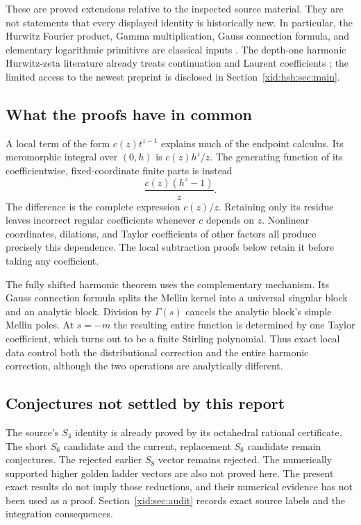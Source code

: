 \documentclass[11pt,a4paper]{article}
\numberwithin{equation}{section}
\theoremstyle{definition}
\theoremstyle{remark}
\begin{document}
These are proved extensions relative to the inspected source material.
They are not statements that every displayed identity is historically
new. In particular, the Hurwitz Fourier product, Gamma multiplication,
Gauss connection formula, and elementary logarithmic primitives are
classical inputs \cite{EspinosaMoll1,EspinosaMoll2,DLMFhurwitz,
hsh:DLMFGauss,wat:DavidH}. The depth-one harmonic Hurwitz-zeta literature
already treats continuation and Laurent coefficients
\cite{hsh:Kargin2023,hsh:KaraCan2026}; the limited access to the newest
preprint is disclosed in Section~\ref{xid:hsh:sec:main}.

\subsection{What the proofs have in common}

A local term of the form $c(z)t^{z-1}$ explains much of the endpoint
calculus. Its meromorphic integral over $(0,h)$ is $c(z)h^z/z$.
The generating function of its coefficientwise, fixed-coordinate finite
parts is instead
\[
 \frac{c(z)(h^z-1)}z.
\]
The difference is the complete expression $c(z)/z$. Retaining only its
residue leaves incorrect regular coefficients whenever $c$ depends on
$z$. Nonlinear coordinates, dilations, and Taylor coefficients of other
factors all produce precisely this dependence. The local subtraction
proofs below retain it before taking any coefficient.

The fully shifted harmonic theorem uses the complementary mechanism.
Its Gauss connection formula splits the Mellin kernel into a universal
singular block and an analytic block. Division by $\Gamma(s)$ cancels
the analytic block's simple Mellin poles. At $s=-m$ the resulting entire
function is determined by one Taylor coefficient, which turns out to be
a finite Stirling polynomial. Thus exact local data control both the
distributional correction and the entire harmonic correction, although
the two operations are analytically different.

\subsection{Conjectures not settled by this report}

The source's $S_4$ identity is already proved by its octahedral rational
certificate. The short $S_6$ candidate and the current, replacement $S_8$
candidate remain conjectures. The rejected earlier $S_8$ vector remains
rejected. The numerically supported higher golden ladder vectors are
also not proved here. The present exact results do not imply those
reductions, and their numerical evidence has not been used as a proof.
Section~\ref{xid:sec:audit} records exact source labels and the integration
consequences.
\end{document}
